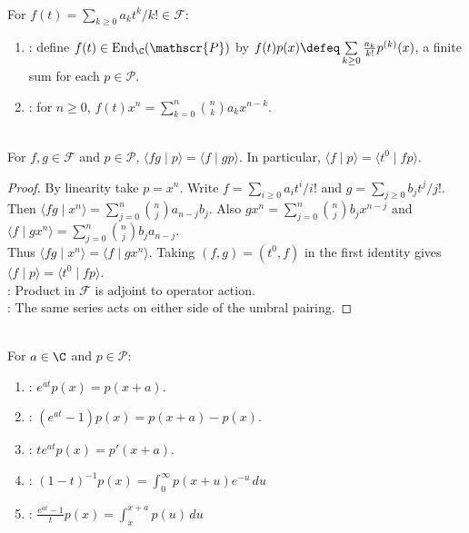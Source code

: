\begin{definition} \label{def:formal-series-as-polynomial-operators} \\
For $f(t)=\sum_{k\geq0}a_kt^k/k!\in\mathscr{F}$:
\begin{enumerate}[label=(\roman*)]
\setlength{\itemsep}{0pt}
\item {}: define $f(t)\in\operatorname{End}_{\C}(\mathscr{P})$ by $f(t)p(x)\defeq\sum\limits_{k\geq0}\frac{a_k}{k!}p^{(k)}(x)$, a finite sum for each $p\in\mathscr{P}$.
\item {}: for $n\geq0$, $f(t)x^n=\sum\limits_{k=0}^{n}\binom{n}{k}a_kx^{n-k}$.
\end{enumerate}
\end{definition}

\begin{theorem} \label{thm:umbral-functional-operator-adjointness} \\
For $f,g\in\mathscr{F}$ and $p\in\mathscr{P}$, $\langle fg\mid p\rangle=\langle f\mid gp\rangle$. In particular, $\langle f\mid p\rangle=\langle t^0\mid fp\rangle$.
\begin{proof}
By linearity take $p=x^n$. Write $f=\sum\limits_{i\geq0}a_it^i/i!$ and $g=\sum\limits_{j\geq0}b_jt^j/j!$.\\
Then $\langle fg\mid x^n\rangle =\sum\limits_{j=0}^{n}\binom{n}{j}a_{n-j}b_j$. Also $gx^n=\sum\limits_{j=0}^{n}\binom{n}{j}b_jx^{n-j}$ and $\langle f\mid gx^n\rangle =\sum\limits_{j=0}^{n}\binom{n}{j}b_ja_{n-j}$.\\
Thus $\langle fg\mid x^n\rangle=\langle f\mid gx^n\rangle$. Taking $(f,g)=(t^0,f)$ in the first identity gives $\langle f\mid p\rangle=\langle t^0\mid fp\rangle$.\\
: Product in $\mathscr{F}$ is adjoint to operator action.\\
: The same series acts on either side of the umbral pairing.
\end{proof}
\end{theorem}

\begin{definition} \label{def:umbral-operators-basic-examples} \\
For $a\in\C$ and $p\in\mathscr{P}$:
\begin{enumerate}[label=(\roman*)]
\setlength{\itemsep}{0pt}
\item {}: $e^{at}p(x)=p(x+a)$.
\item {}: $(e^{at}-1)p(x)=p(x+a)-p(x)$.
\item {}: $te^{at}p(x)=p'(x+a)$.
\item {}: $(1-t)^{-1}p(x)=\int_0^\infty p(x+u)e^{-u}\,du$
\item {}: $\frac{e^{at}-1}{t}p(x)=\int_x^{x+a}p(u)\,du$
\end{enumerate}
\end{definition}

